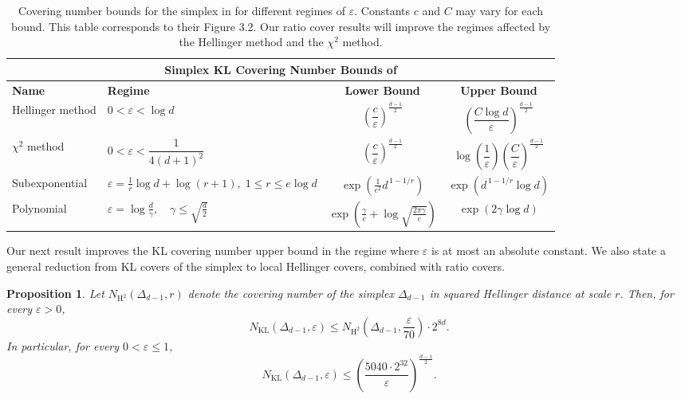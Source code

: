 \documentclass[11pt]{article}
\renewcommand{\le}{\leqslant}
\newcommand{\eps}{\varepsilon}
\newcommand{\kl}{\operatorname{KL}}
\newcommand{\hel}{\operatorname{H}}
\newcommand{\hels}{\hel^2}
\newtheorem{proposition}{Proposition}
\theoremstyle{definition}
\theoremstyle{remark}
\begin{document}
{
\begin{table}[htbp]
\scriptsize
\centering
\renewcommand{\arraystretch}{1.7}
\setlength{\tabcolsep}{10pt}
\begin{tabular}{|l|l|c|c|}
\hline
\multicolumn{4}{|c|}{\textbf{ Simplex KL Covering Number Bounds of \cite{tang2022divergence}}}\\
\hline
\textbf{Name} & \textbf{Regime} & \textbf{Lower Bound} & \textbf{Upper Bound}\\
\hline
Hellinger method
& $0<\varepsilon<\log d$
& $\left(\dfrac{c}{\varepsilon}\right)^{\frac{d-1}{2}}$
& $\left(\dfrac{C\log d}{\varepsilon}\right)^{\frac{d-1}{2}}$
\\
\hline
$\chi^2$ method
& $0<\varepsilon<\dfrac{1}{4(d+1)^2}$
& $\left(\dfrac{c}{\varepsilon}\right)^{\frac{d-1}{2}}$
& $\log \left(\dfrac{1}{\varepsilon}\right)
  \left(\dfrac{C}{\varepsilon}\right)^{\frac{d-1}{2}}$
\\
\hline
Subexponential
& $\displaystyle \varepsilon=\frac{1}{r}\log d+\log(r+1),\; 1\le r\le e\log d$
& $\exp\left(\frac{1}{e^{2}} d^{\,1-1/r}\right)$
& $\exp({d^{\,1-1/r} \log d})$
\\
\hline
Polynomial
& $\displaystyle \varepsilon=\log\frac{d}{\gamma},\quad
   \gamma\le\sqrt{\frac{d}{2}}$
& $\exp({\frac{\gamma}{e} + \log \sqrt{\frac{2\pi\gamma}{e}}})$
& $\exp(2\gamma \log d)$
\\
\hline
\end{tabular}
\caption{Covering number bounds for the simplex in \cite{tang2022divergence} for different regimes of $\varepsilon$. Constants $c$ and $C$ may vary for each bound. This table corresponds to their Figure 3.2. Our ratio cover results will improve the regimes affected by the Hellinger method and the $\chi^2$ method.\label{table:tang}}
\end{table}
}

Our next result improves the KL covering number upper bound in the regime where $\eps$ is at most an absolute constant. We also state a general reduction from KL covers of the simplex to local Hellinger covers, combined with ratio covers.

\begin{proposition}\label{prop:kl-cover}
Let $N_{\hels}(\Delta_{d-1},r)$ denote the covering number of the simplex $\Delta_{d-1}$ in squared Hellinger distance at scale $r$.
Then, for every $\eps>0$,
\[
N_{\kl}(\Delta_{d-1},\eps)\le N_{\hels}\left(\Delta_{d-1},\frac{\eps}{70}\right)\cdot 2^{8d}.
\]
In particular, for every $0<\eps\le 1$,
\[
N_{\kl}(\Delta_{d-1},\eps)\le\left(\frac{5040\cdot 2^{32}}{\eps}\right)^{\frac{d-1}{2}}.
\]
\end{proposition}
\end{document}
